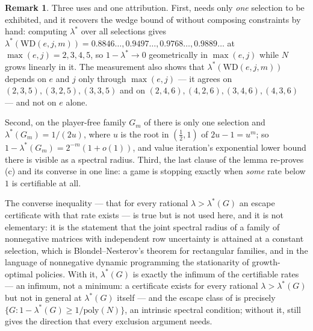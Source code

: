 \documentclass[11pt]{article}
\theoremstyle{plain}
\theoremstyle{definition}
\newtheorem{remark}[theorem]{Remark}
\begin{document}
\begin{remark}\label{rem:escape-rate}
Three uses and one attribution. First,  needs only
\emph{one} selection to be exhibited, and it recovers the wedge bound of
 without composing constraints by hand: computing
$\lambda^{\ast}$ over all selections gives
$\lambda^{\ast}(\mathrm{WD}(e,j,m))=0.8846\ldots,0.9497\ldots,0.9768\ldots,0.9889\ldots$
at $\max(e,j)=2,3,4,5$, so $1-\lambda^{\ast}\to0$ geometrically in $\max(e,j)$
while $N$ grows linearly in it. The measurement also shows that
$\lambda^{\ast}(\mathrm{WD}(e,j,m))$ depends on $e$ and $j$ only through
$\max(e,j)$ --- it agrees on $(2,3,5),(3,2,5),(3,3,5)$ and on
$(2,4,6),(4,2,6),(3,4,6),(4,3,6)$ --- and not on $e$ alone.

Second, on the player-free family $G_m$ of  there is
only one selection and $\lambda^{\ast}(G_m)=1/(2u)$, where $u$ is the root in
$(\tfrac12,1)$ of $2u-1=u^{m}$; so $1-\lambda^{\ast}(G_m)=2^{-m}(1+o(1))$, and
value iteration's exponential lower bound there is visible as a spectral
radius. Third, the last clause of the lemma re-proves
(c) and its converse in one line: a game is stopping
exactly when \emph{some} rate below $1$ is certifiable at all.

The converse inequality --- that for every rational $\lambda>\lambda^{\ast}(G)$
an escape certificate with that rate exists --- is true but is not used
here, and it is not elementary: it is the statement that the joint
spectral radius of a family of nonnegative matrices with independent row
uncertainty is attained at a constant selection, which is
Blondel--Nesterov's theorem for rectangular families, and in the language
of nonnegative dynamic programming the stationarity of growth-optimal
policies. With it, $\lambda^{\ast}(G)$ is exactly the infimum of the certifiable rates ---
an infimum, not a minimum: a certificate exists for every rational
$\lambda>\lambda^{\ast}(G)$ but not in general at $\lambda^{\ast}(G)$ itself --- and the
escape class of  is precisely
$\{G:1-\lambda^{\ast}(G)\ge1/\mathrm{poly}(N)\}$, an intrinsic spectral
condition; without it,  still gives the direction
that every exclusion argument needs.
\end{remark}
\end{document}
